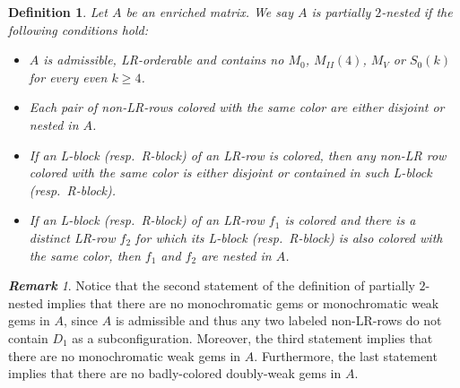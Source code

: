 \documentclass[12pt]{book}
\theoremstyle{plain}
\newtheorem{defn}[teo]{Definition}
\theoremstyle{remark}
\newtheorem{remark}[teo]{\textbf{\textit{Remark}}}
\begin{document}
\begin{defn} \label{def:partially_2-nested}
	Let $A$ be an enriched matrix. We say $A$ is \emph{partially $2$-nested} if the following conditions hold:
	 \begin{itemize}
	 	\item $A$ is admissible, LR-orderable and contains no $M_0$, $M_{II}(4)$, $M_V$ or $S_0(k)$ for every even $k \geq 4$.
	 
	 	\item Each pair of non-LR-rows colored with the same color are either disjoint or nested in $A$.
	 	\item If an L-block (resp.\ R-block) of an LR-row is colored, then any non-LR row colored with the same color is either disjoint or contained in such L-block (resp.\ R-block).
	  	\item If an L-block (resp.\ R-block) of an LR-row $f_1$ is colored and there is a distinct LR-row $f_2$ for which its L-block (resp.\ R-block) is also colored with the same color, then $f_1$ and $f_2$ are nested in $A$.
	 \end{itemize}
\end{defn} 


\begin{comment}
The tagged matrix of the $0$-gem, $1$-gem and $2$-gem are the following tagged matrices:


\[ 		\begin{pmatrix}
		 1 & 1 & 0 \cr
		0 & 1 & 1
		\end{pmatrix}, \qquad
		\begin{pmatrix}
		\pmb 1 & 1 & 0 \cr
		\pmb 0 & 1 & 1
		\end{pmatrix}, \qquad
		\begin{pmatrix}
		\pmb 1 & 1 & 1 & 0 & \pmb 1 \cr
		\pmb 1 & 1 & 0 & 1 & \pmb 1
		\end{pmatrix}  \]
respectively.
\end{comment}


\begin{remark} \label{obs:partially2nested_hasnogems}
Notice that the second statement of the definition of partially $2$-nested implies that there are no monochromatic gems or monochromatic weak gems in $A$, since $A$ is admissible and thus any two labeled non-LR-rows do not contain $D_1$ as a subconfiguration. 
Moreover, the third statement implies that there are no monochromatic weak gems in $A$.
Furthermore, the last statement implies that there are no badly-colored doubly-weak gems in $A$.
\end{remark}
\end{document}
